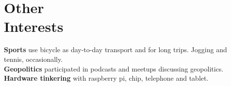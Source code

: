 	\section{Other \\Interests} 

   \textbf{Sports} use bicycle as day-to-day transport and for long trips. Jogging and tennis, occasionally. \\
   \textbf{Geopolitics} participated in podcasts and meetups discussing geopolitics. \\
   \textbf{Hardware tinkering} with raspberry pi, chip, telephone and tablet.
	